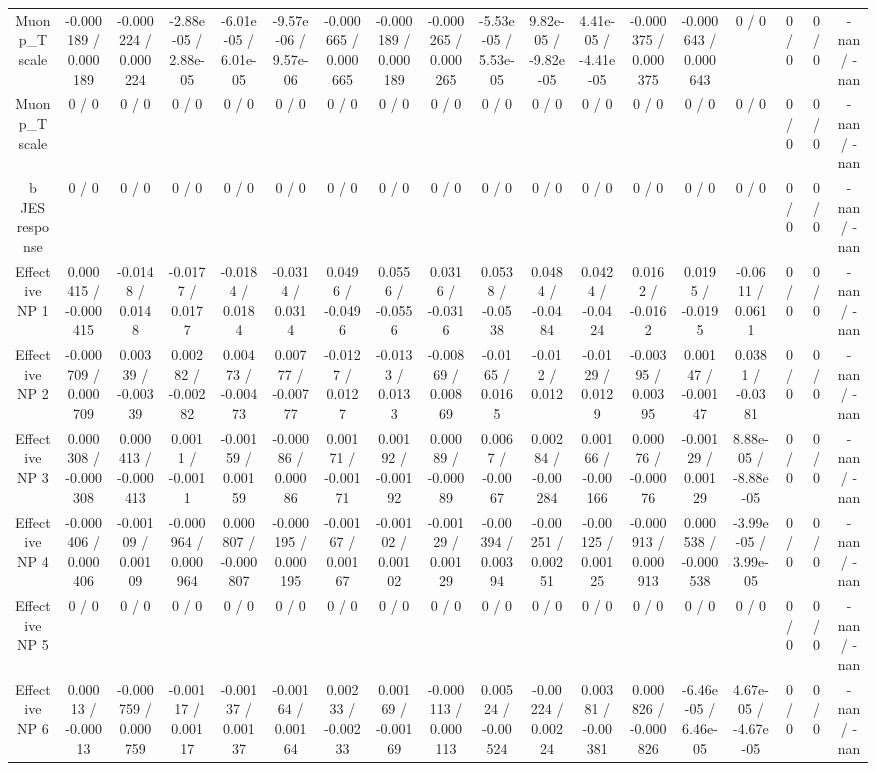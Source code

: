 \documentclass[10pt]{article}
\begin{document}
\begin{table}[htbp]
\begin{center}
\begin{tabular}{|c|c|c|c|c|c|c|c|c|c|c|c|c|c|c|c|c|c|}
  Muon p_{T} scale & -0.000189 / 0.000189 & -0.000224 / 0.000224 & -2.88e-05 / 2.88e-05 & -6.01e-05 / 6.01e-05 & -9.57e-06 / 9.57e-06 & -0.000665 / 0.000665 & -0.000189 / 0.000189 & -0.000265 / 0.000265 & -5.53e-05 / 5.53e-05 & 9.82e-05 / -9.82e-05 & 4.41e-05 / -4.41e-05 & -0.000375 / 0.000375 & -0.000643 / 0.000643 & 0 / 0 & 0 / 0 & 0 / 0 & -nan / -nan \\ 
  Muon p_{T} scale & 0 / 0 & 0 / 0 & 0 / 0 & 0 / 0 & 0 / 0 & 0 / 0 & 0 / 0 & 0 / 0 & 0 / 0 & 0 / 0 & 0 / 0 & 0 / 0 & 0 / 0 & 0 / 0 & 0 / 0 & 0 / 0 & -nan / -nan \\ 
  b JES response & 0 / 0 & 0 / 0 & 0 / 0 & 0 / 0 & 0 / 0 & 0 / 0 & 0 / 0 & 0 / 0 & 0 / 0 & 0 / 0 & 0 / 0 & 0 / 0 & 0 / 0 & 0 / 0 & 0 / 0 & 0 / 0 & -nan / -nan \\ 
  Effective NP 1 & 0.000415 / -0.000415 & -0.0148 / 0.0148 & -0.0177 / 0.0177 & -0.0184 / 0.0184 & -0.0314 / 0.0314 & 0.0496 / -0.0496 & 0.0556 / -0.0556 & 0.0316 / -0.0316 & 0.0538 / -0.0538 & 0.0484 / -0.0484 & 0.0424 / -0.0424 & 0.0162 / -0.0162 & 0.0195 / -0.0195 & -0.0611 / 0.0611 & 0 / 0 & 0 / 0 & -nan / -nan \\ 
  Effective NP 2 & -0.000709 / 0.000709 & 0.00339 / -0.00339 & 0.00282 / -0.00282 & 0.00473 / -0.00473 & 0.00777 / -0.00777 & -0.0127 / 0.0127 & -0.0133 / 0.0133 & -0.00869 / 0.00869 & -0.0165 / 0.0165 & -0.012 / 0.012 & -0.0129 / 0.0129 & -0.00395 / 0.00395 & 0.00147 / -0.00147 & 0.0381 / -0.0381 & 0 / 0 & 0 / 0 & -nan / -nan \\ 
  Effective NP 3 & 0.000308 / -0.000308 & 0.000413 / -0.000413 & 0.0011 / -0.0011 & -0.00159 / 0.00159 & -0.00086 / 0.00086 & 0.00171 / -0.00171 & 0.00192 / -0.00192 & 0.00089 / -0.00089 & 0.0067 / -0.0067 & 0.00284 / -0.00284 & 0.00166 / -0.00166 & 0.00076 / -0.00076 & -0.00129 / 0.00129 & 8.88e-05 / -8.88e-05 & 0 / 0 & 0 / 0 & -nan / -nan \\ 
  Effective NP 4 & -0.000406 / 0.000406 & -0.00109 / 0.00109 & -0.000964 / 0.000964 & 0.000807 / -0.000807 & -0.000195 / 0.000195 & -0.00167 / 0.00167 & -0.00102 / 0.00102 & -0.00129 / 0.00129 & -0.00394 / 0.00394 & -0.00251 / 0.00251 & -0.00125 / 0.00125 & -0.000913 / 0.000913 & 0.000538 / -0.000538 & -3.99e-05 / 3.99e-05 & 0 / 0 & 0 / 0 & -nan / -nan \\ 
  Effective NP 5 & 0 / 0 & 0 / 0 & 0 / 0 & 0 / 0 & 0 / 0 & 0 / 0 & 0 / 0 & 0 / 0 & 0 / 0 & 0 / 0 & 0 / 0 & 0 / 0 & 0 / 0 & 0 / 0 & 0 / 0 & 0 / 0 & -nan / -nan \\ 
  Effective NP 6 & 0.00013 / -0.00013 & -0.000759 / 0.000759 & -0.00117 / 0.00117 & -0.00137 / 0.00137 & -0.00164 / 0.00164 & 0.00233 / -0.00233 & 0.00169 / -0.00169 & -0.000113 / 0.000113 & 0.00524 / -0.00524 & -0.00224 / 0.00224 & 0.00381 / -0.00381 & 0.000826 / -0.000826 & -6.46e-05 / 6.46e-05 & 4.67e-05 / -4.67e-05 & 0 / 0 & 0 / 0 & -nan / -nan \\ 

\end{tabular}
\end{center}
\end{table}
\end{document}
